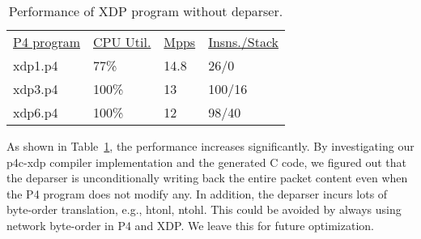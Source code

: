 \begin{table}
\centering
\small
\begin{tabular}{llll}
  \underline{P4 program} & \underline{CPU Util.} & \underline{Mpps} & \underline{Insns./Stack}\\
  xdp1.p4 &  77\% &  14.8 & 26/0 \\
  xdp3.p4 &  100\% &  13 & 100/16 \\
  xdp6.p4 &  100\% &  12 & 98/40 \\
\end{tabular}
\caption{\footnotesize Performance of XDP program without deparser.}
\label{tab:perf2}
\end{table}

As shown in Table~\ref{tab:perf2}, the performance increases significantly.
By investigating our p4c-xdp compiler implementation and the generated C
code, we figured out that the deparser is unconditionally writing back
the entire packet content even when the P4 program does not modify any.
In addition, the deparser incurs lots of byte-order translation, e.g.,
htonl, ntohl. This could be avoided by always using network byte-order
in P4 and XDP. We leave this for future optimization.
